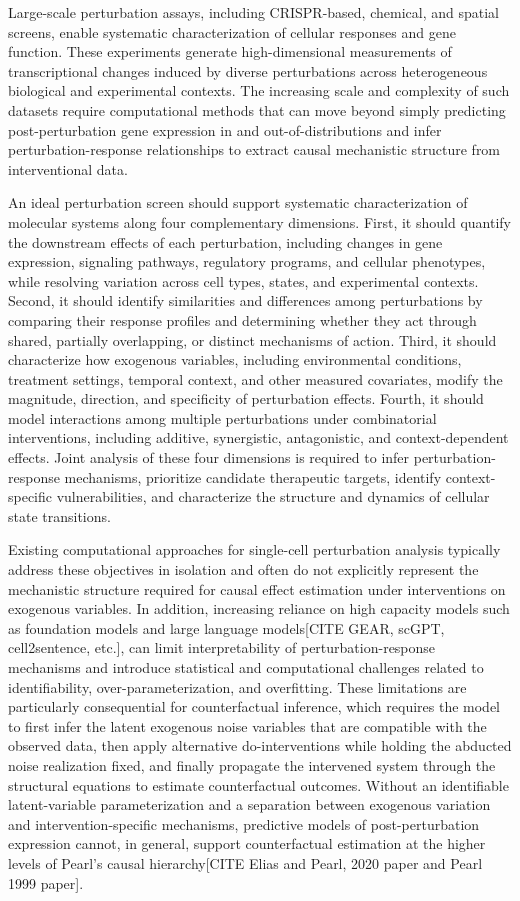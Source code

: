 Large-scale perturbation assays, including CRISPR-based, chemical, and spatial screens, enable
systematic characterization of cellular responses and gene function. These experiments generate
high-dimensional measurements of transcriptional changes induced by diverse perturbations across
heterogeneous biological and experimental contexts. The increasing scale and complexity of such
datasets require computational methods that can move beyond simply predicting post-perturbation gene
expression in and out-of-distributions and infer perturbation-response relationships to extract
causal mechanistic structure from interventional data.

An ideal perturbation screen should support systematic characterization of molecular systems along
four complementary dimensions. First, it should quantify the downstream effects of each perturbation,
including changes in gene expression, signaling pathways, regulatory programs, and cellular
phenotypes, while resolving variation across cell types, states, and experimental contexts. Second,
it should identify similarities and differences among perturbations by comparing their response
profiles and determining whether they act through shared, partially overlapping, or distinct
mechanisms of action. Third, it should characterize how exogenous variables, including environmental
conditions, treatment settings, temporal context, and other measured covariates, modify the
magnitude, direction, and specificity of perturbation effects. Fourth, it should model interactions
among multiple perturbations under combinatorial interventions, including additive, synergistic,
antagonistic, and context-dependent effects. Joint analysis of these four dimensions is required to
infer perturbation-response mechanisms, prioritize candidate therapeutic targets, identify
context-specific vulnerabilities, and characterize the structure and dynamics of cellular state
transitions.

Existing computational approaches for single-cell perturbation analysis typically address these
objectives in isolation and often do not explicitly represent the mechanistic structure required for
causal effect estimation under interventions on exogenous variables. In addition, increasing reliance
on high capacity models such as foundation models and large language models[CITE GEAR, scGPT,
cell2sentence, etc.], can limit interpretability of perturbation-response mechanisms and introduce
statistical and computational challenges related to identifiability, over-parameterization, and
overfitting. These limitations are particularly consequential for counterfactual inference, which
requires the model to first infer the latent exogenous noise variables that are compatible with the
observed data, then apply alternative do-interventions while holding the abducted noise realization
fixed, and finally propagate the intervened system through the structural equations to estimate
counterfactual outcomes. Without an identifiable latent-variable parameterization and a separation
between exogenous variation and intervention-specific mechanisms, predictive models of
post-perturbation expression cannot, in general, support counterfactual estimation at the higher
levels of Pearl's causal hierarchy[CITE Elias and Pearl, 2020 paper and Pearl 1999 paper].

